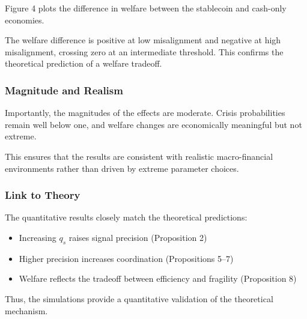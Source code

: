 Figure 4 plots the difference in welfare between the stablecoin and cash-only economies.

The welfare difference is positive at low misalignment and negative at high misalignment, crossing zero at an intermediate threshold. This confirms the theoretical prediction of a welfare tradeoff.

\subsubsection{Magnitude and Realism}

Importantly, the magnitudes of the effects are moderate. Crisis probabilities remain well below one, and welfare changes are economically meaningful but not extreme.

This ensures that the results are consistent with realistic macro-financial environments rather than driven by extreme parameter choices.

\subsubsection{Link to Theory}

The quantitative results closely match the theoretical predictions:

\begin{itemize}
\item Increasing $q_s$ raises signal precision (Proposition 2)
\item Higher precision increases coordination (Propositions 5--7)
\item Welfare reflects the tradeoff between efficiency and fragility (Proposition 8)
\end{itemize}

Thus, the simulations provide a quantitative validation of the theoretical mechanism.
